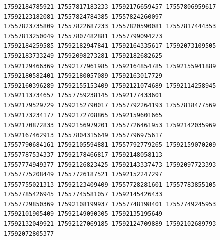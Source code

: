 \documentclass[10pt]{article}
\begin{document}
\begin{verbatim}
17592184785921 17557817183233 17592176659457 17557806959617 17592123182081 17557824784385 17557824260097
17557823735809 17557822687233 17557820590081 17557817444353 17557813250049 17557807482881 17557799094273
17592184259585 17592182947841 17592164335617 17592073109505 17592183733249 17592098273281 17592182682625
17592129466369 17592177961985 17592164854785 17592155941889 17592180582401 17592180057089 17592163017729
17592160396289 17592155153409 17592121074689 17592114258945 17592113734657 17557759238145 17592177433601
17592179529729 17592152790017 17557792264193 17557818477569 17592173234177 17592172708865 17592159601665
17592170872833 17592156979201 17557726461953 17592142035969 17592167462913 17557804315649 17557796975617
17557790684161 17592105594881 17557792779265 17592159070209 17557787534337 17592178466817 17592148058113
17557774949377 17592126823425 17592143337473 17592097723393 17557775208449 17557726187521 17592152247297
17557755021313 17592123409409 17557728281601 17557783855105 17557785426945 17557745581057 17592145426433
17557729850369 17592108199937 17557748198401 17557749245953 17592101905409 17592149090305 17592135195649
17592132049921 17592127069185 17592124709889 17592102689793 17592072805377
\end{verbatim}
\end{document}
